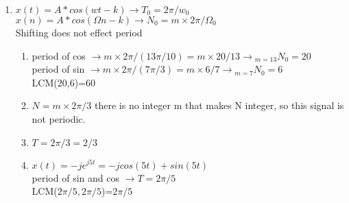 \documentclass[10pt,a4paper, margin=1in]{article}
\begin{document}
\begin{enumerate}
\item 
    $ x(t)=A*cos(wt-k)  \xrightarrow{} T_0 = 2\pi/w_0 $\\
    $ x(n)=A*cos(\Omega n-k) \xrightarrow{} N_0=m \times 2\pi/\Omega_0 $\\
    Shifting does not effect period
    \begin{enumerate}
    \item %
        period of cos $\rightarrow{}  m \times 2\pi/(13\pi/10) = m \times 20/13 \rightarrow{}_{m=13} N_0=20$ \\
        period of sin $ \rightarrow{}  m \times 2\pi/(7\pi/3) = m \times 6/7 \rightarrow{}_{m=7} N_0=6$ \\
        LCM(20,6)=60
    \item %
        $N=m\times2\pi/3$ there is no integer m that makes N integer, so this signal is not periodic.
    \item %
        $T=2\pi/3=2/3$
    \item %
    $x(t)=-je^{j5t}=-jcos(5t)+sin(5t)$\\
    period of sin and cos $\rightarrow{} T=2\pi/5$\\
    LCM($2\pi/5,2\pi/5$)=$2\pi/5$
    \end{enumerate}


\end{enumerate}
\end{document}
